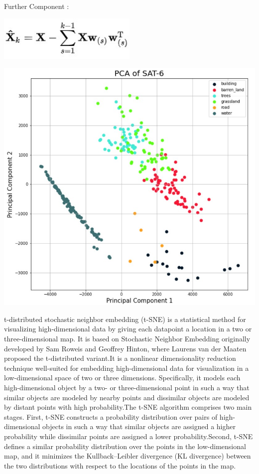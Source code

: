 \documentclass[12pt, letterpaper]{article}
\begin{document}
Further Component :
\begin{center}
             \includegraphics[width=0.5\textwidth]{figures/secondc.jpg}
\end{center}
\newpage
\begin{center}
             \includegraphics{figures/pca.jpg}
\end{center}
\newpage
\hspace*{0.25 in}t-distributed stochastic neighbor embedding (t-SNE) is a statistical method for visualizing high-dimensional data by giving each datapoint a location in a two or three-dimensional map. It is based on Stochastic Neighbor Embedding originally developed by Sam Roweis and Geoffrey Hinton, where Laurens van der Maaten proposed the t-distributed variant.It is a nonlinear dimensionality reduction technique well-suited for embedding high-dimensional data for visualization in a low-dimensional space of two or three dimensions. Specifically, it models each high-dimensional object by a two- or three-dimensional point in such a way that similar objects are modeled by nearby points and dissimilar objects are modeled by distant points with high probability.The t-SNE algorithm comprises two main stages. First, t-SNE constructs a probability distribution over pairs of high-dimensional objects in such a way that similar objects are assigned a higher probability while dissimilar points are assigned a lower probability.Second, t-SNE defines a similar probability distribution over the points in the low-dimensional map, and it minimizes the Kullback–Leibler divergence (KL divergence) between the two distributions with respect to the locations of the points in the map.
\end{document}
